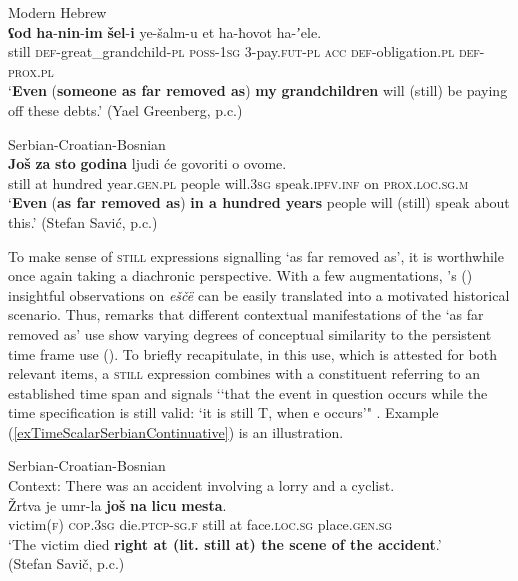 \begin{exe}
	\ex Modern Hebrew\label{exTimeScalarRemoteFutureHebrew}\\
	\gll \textbf{ʕod} \textbf{ha}-\textbf{nin}-\textbf{im} \textbf{šel}-\textbf{i} ye-šalm-u et ha-ħovot ha-ʼele.\\
	still \textsc{def}-great\_grandchild-\textsc{pl} \textsc{poss}-1\textsc{sg} 3-pay.\textsc{fut}-\textsc{pl} \textsc{acc} \textsc{def}-obligation.\textsc{pl} \textsc{def}-\textsc{prox}.\textsc{pl}\\
	\glt \lq \textbf{Even} (\textbf{someone as far removed as}) \textbf{my} \textbf{grandchildren} will (still) be paying off these debts.\rq{ }(Yael Greenberg, p.c.)
	
	\ex Serbian-Croatian-Bosnian\label{exTimeScalarRemoteFutureSerbian}\\
	\gll \textbf{Još} \textbf{za} \textbf{sto} \textbf{godina} ljudi će govoriti o ovome.\\
	still at hundred year.\textsc{gen}.\textsc{pl} people will.3\textsc{sg} speak.\textsc{ipfv}.\textsc{inf} on \textsc{prox}.\textsc{loc}.\textsc{sg}.\textsc{m}\\
	\glt \lq \textbf{Even} (\textbf{as far removed as}) \textbf{in a hundred years} people will (still) speak about this.\rq{ }(Stefan Savić, p.c.)
\end{exe}

To make sense of \textsc{still} expressions signalling \lq as far removed as\rq{}, it is worthwhile once again taking a diachronic perspective. With a few augmentations,  \citeauthor{Mustajoki1988}'s (\citeyear{Mustajoki1988}) insightful observations on  \textit{eščë} can be easily translated into a motivated historical scenario. Thus, \citeauthor{Mustajoki1988} remarks that different contextual manifestations of the \lq as far removed as\rq{ }use show varying degrees of conceptual similarity to the persistent time frame use (). To briefly recapitulate, in this use, which is attested for both relevant items, a \textsc{still} expression combines with a constituent referring to an established time span and signals \lq\lq that the event in question occurs while the time specification is still valid: \lq it is still T, when e occurs'" \parencite[202]{Loebner1989}. Example (\ref{exTimeScalarSerbianContinuative}) is an illustration.

 \begin{exe}
	\ex Serbian-Croatian-Bosnian\label{exTimeScalarSerbianContinuative}\\
	Context: There was an accident involving a lorry and a cyclist.\\
	\gll Žrtva je umr-la \textbf{još} \textbf{na} \textbf{licu} \textbf{mesta}.\\
	victim(\textsc{f}) \textsc{cop}.3\textsc{sg} die.\textsc{ptcp}-\textsc{sg}.\textsc{f} still at face.\textsc{loc}.\textsc{sg} place.\textsc{gen}.\textsc{sg}\\
	\glt \lq The victim died \textbf{right at (lit. still at) the scene of the accident}.'
	\\(Stefan Savič, p.c.) 
\end{exe}

